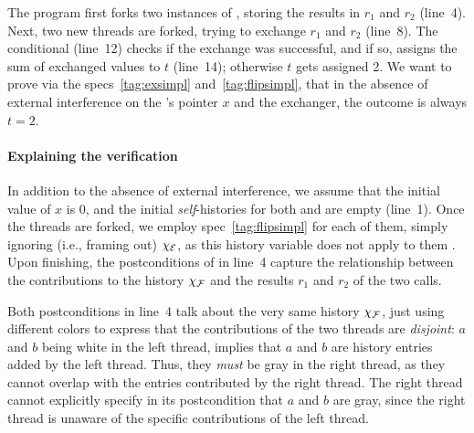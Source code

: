 %

The program first forks two instances of , storing the
results in $r_1$ and $r_2$ (line~4). Next, two new threads are forked,
trying to exchange $r_1$ and $r_2$ (line~8). The conditional (line~12)
checks if the exchange was successful, and if so, assigns the sum of
exchanged values to $t$ (line~14); otherwise $t$ gets assigned 2. We
want to prove via the specs~\eqref{tag:exsimpl}
and~\eqref{tag:flipsimpl}, that in the absence of external
interference on the 's pointer $x$ and the exchanger, the
outcome is always $t = 2$.

\paragraph{Explaining the verification}

In addition to the absence of external interference, we assume that
the initial value of $x$ is $0$, and the initial \emph{self}-histories
for both  and  are empty (line~1).
%
%
%
%
%
Once the  threads are forked, we employ
spec~\eqref{tag:flipsimpl} for each of them, simply ignoring (i.e.,
framing out) $\chi_{\cal E}$, as this history variable does not apply
to them . Upon finishing, the postconditions of
 in line~4 capture the relationship between the
contributions to the history $\chi_{\cal F}$ and the results $r_1$
and $r_2$ of the two calls.

Both postconditions in line~4 talk about the very same history
$\chi_{\cal F}$, just using different colors to express that the
contributions of the two threads are \emph{disjoint}: $a$ and $b$
being white in the left thread, implies that $a$ and $b$ are history
entries added by the left thread. Thus, they \emph{must} be gray in
the right thread, as they cannot overlap with the entries contributed
by the right thread. The right thread cannot explicitly specify in its
postcondition that $a$ and $b$ are gray, since the right thread is
unaware of the specific contributions of the left thread.
%

